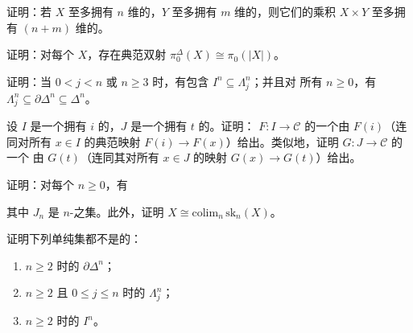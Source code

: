 \begin{exercise}\label{ex:product-nondegenerate-dimension}
证明：若\trSimplicialSet{} $X$ 至多拥有 $n$ 维的\trNonDegenerate{}\trSimplex{}，$Y$
至多拥有 $m$ 维的\trNonDegenerate{}\trSimplex{}，则它们的乘积 $X \times Y$ 至多拥有
$(n + m)$ 维的\trNonDegenerate{}\trSimplex{}。
\end{exercise}

\begin{exercise}\label{ex:pi0-realization}
证明：对每个\trSimplicialSet{} $X$，存在典范双射
$\pi^{\Delta}_0(X) \cong \pi_0(|X|)$。
\end{exercise}

\begin{exercise}\label{ex:spine-horn-boundary-inclusions}
证明：当 $0 < j < n$ 或 $n \ge 3$ 时，有包含 $I^n \subseteq \Lambda^n_j$；并且对%
所有 $n \ge 0$，有 $\Lambda^n_j \subseteq \partial\Delta^n \subseteq \Delta^n$。
\end{exercise}

\begin{exercise}\label{ex:limit-initial-object}
设 $I$ 是一个拥有\trInitialObject{} $i$ 的\trCategory{}，$J$ 是一个拥有%
\trTerminalObject{} $t$ 的\trCategory{}。证明：\trFunctor{} $F\colon I \to \mathcal{C}$
的一个\trLimit{}由 $F(i)$（连同对所有 $x \in I$ 的典范映射
$F(i) \to F(x)$）给出。类似地，证明\trFunctor{} $G\colon J \to \mathcal{C}$ 的一个%
\trColimit{}由 $G(t)$（连同其对所有 $x \in J$ 的映射 $G(x) \to G(t)$）给出。
\end{exercise}

\begin{exercise}\label{ex:skeleton-pushout-filtration}
证明：对每个 $n \ge 0$，有\trPushout{}%
\begin{center}
\end{center}
其中 $J_n$ 是\trNonDegenerate{} $n$-\trSimplex{}之集。此外，证明
$X \cong \mathrm{colim}_n\,\mathrm{sk}_n(X)$。
\end{exercise}

\begin{exercise}\label{ex:not-nerves-of-categories}
证明下列单纯集都不是\trCategory{}的\trNerve{}：
\begin{enumerate}[label=(\arabic*)]
  \item $n \ge 2$ 时的 $\partial\Delta^n$；
  \item $n \ge 2$ 且 $0 \le j \le n$ 时的 $\Lambda^n_j$；
  \item $n \ge 2$ 时的 $I^n$。
\end{enumerate}
\end{exercise}

